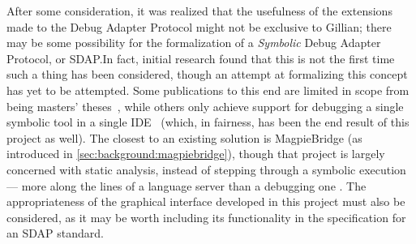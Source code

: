 After some consideration, it was realized that the usefulness of the extensions
made to the Debug Adapter Protocol might not be exclusive to Gillian; there may
be some possibility for the formalization of a \textit{Symbolic} Debug Adapter
Protocol, or SDAP.\@ In fact, initial research found that this is not the first
time such a thing has been considered, though an attempt at formalizing this
concept has yet to be attempted. Some publications to this end are limited in
scope from being masters' theses~\cite{sdap-arxiv, sdap-aurecchia},  while others
only achieve support for debugging a single symbolic tool in a single
IDE~\cite{sdap-colombo, sdap-kps}  (which, in fairness, has been the end result
of this project as well).
The closest to an existing solution is MagpieBridge (as introduced in
\autoref{sec:background:magpiebridge}), though that project is largely concerned
with static analysis, instead of stepping through a symbolic execution --- more
along the lines of a language server than a debugging one .
The appropriateness of the graphical interface developed in this project must
also be considered, as it may be worth including its functionality in the
specification for an SDAP standard.

